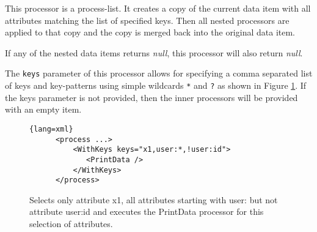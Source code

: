 
This processor is a process-list. It creates a copy of the current data
item with all attributes matching the list of specified keys. Then all
nested processors are applied to that copy and the copy is merged back
into the original data item.

If any of the nested data items returns \emph{null}, this processor will
also return \emph{null}.

The \texttt{keys} parameter of this processor allows for specifying a
comma separated list of keys and key-patterns using simple wildcards
\texttt{*} and \texttt{?} as shown in Figure \ref{fig:withKeys}. If
the {\ttfamily keys} parameter is not provided, then the inner
processors will be provided with an empty item.

\begin{figure}[h!]
\begin{lstlisting}{lang=xml}
      <process ...>
          <WithKeys keys="x1,user:*,!user:id">
             <PrintData />
          </WithKeys>
      </process>
\end{lstlisting}
\caption{\label{fig:withKeys}Selects only attribute {\ttfamily x1},
  all attributes starting with {\ttfamily user:} but not attribute
  {\ttfamily user:id} and executes the {\ttfamily PrintData} processor
  for this selection of attributes.}
\end{figure}


\begin{table}[h]
\end{table}
